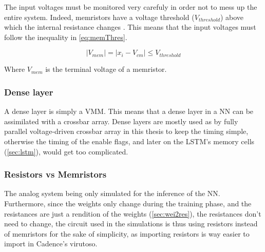 The input voltages must be monitored very carefuly in order not to mess up the entire system. Indeed, memristors have a voltage threshold ($V_{threshold}$) above which the internal resistance changes \cite{memristorSpiceModels,memCadenceModel,memTEAMmodel,memVTEAMmodel}. This means that the input voltages must follow the inequality in \cref{eq:memThres}.

\begin{equation}\label{eq:memThres}
  |V_{mem}|= |x_i-V_{cm}|\le V_{threshold}
\end{equation}

Where $V_{mem}$ is the terminal voltage of a memristor.

\subsubsection{Dense layer}

A dense layer is simply a \ac{VMM}. This means that a dense layer in a \ac{NN} can be assimilated with a crossbar array. Dense layers are mostly used as by fully parallel voltage-driven crossbar array in this thesis to keep the timing simple, otherwise the timing of the enable flags, and later on the \ac{LSTM}'s memory cells (\cref{sec:lstm}), would get too complicated.

\subsubsection{Resistors vs Memristors}

The analog system being only simulated for the inference of the \ac{NN}. Furthermore, since the weights only change during the training phase, and the resistances are just a rendition of the weights (\cref{sec:wei2res}), the resistances don't need to change, the circuit used in the simulations is thus using resistors instead of memristors for the sake of simplicity, as importing resistors is way easier to import in Cadence's virutoso.
